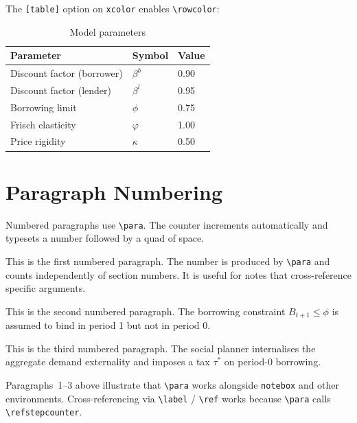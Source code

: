 \documentclass[11pt,a4paper]{article}
\begin{document}
The \texttt{[table]} option on \texttt{xcolor} enables \verb|\rowcolor|:

\begin{table}[h!]
\centering
\caption{Model parameters}
\begin{tabularx}{0.7\linewidth}{lYY}
    \toprule
    \textbf{Parameter} & \textbf{Symbol} & \textbf{Value} \\
    \midrule
     Discount factor (borrower) & $\beta^b$ & 0.90 \\
    Discount factor (lender)  & $\beta^l$ & 0.95 \\
     Borrowing limit           & $\phi$    & 0.75 \\
    Frisch elasticity         & $\varphi$ & 1.00 \\
     Price rigidity            & $\kappa$  & 0.50 \\
    \bottomrule
\end{tabularx}
\end{table}

\section{Paragraph Numbering}

Numbered paragraphs use \verb|\para|. The counter increments automatically and typesets a number followed by a quad of space.

\para This is the first numbered paragraph. The number is produced by \verb|\para| and counts independently of section numbers. It is useful for notes that cross-reference specific arguments.

\para This is the second numbered paragraph. The borrowing constraint $B_{t+1} \leq \phi$ is assumed to bind in period 1 but not in period 0.

\para This is the third numbered paragraph. The social planner internalises the aggregate demand externality and imposes a tax $\tau^*$ on period-0 borrowing.

\begin{notebox}
    Paragraphs~1--3 above illustrate that \verb|\para| works alongside \verb|notebox| and other environments. Cross-referencing via \verb|\label| / \verb|\ref| works because \verb|\para| calls \verb|\refstepcounter|.
\end{notebox}

\end{document}

